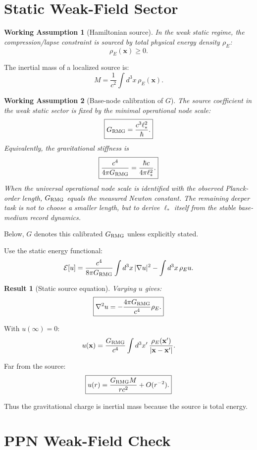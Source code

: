 \documentclass[11pt]{article}
\newtheorem{assumption}{Working Assumption}
\newtheorem{result}{Result}
\begin{document}
\section{Static Weak-Field Sector}

\begin{assumption}[Hamiltonian source]
In the weak static regime, the compression/lapse constraint is sourced by total
physical energy density $\rho_E$:
\[
\rho_E(\mathbf x)\ge0.
\]
\end{assumption}

The inertial mass of a localized source is:
\[
M
=
\frac{1}{c^2}\int d^3x\,\rho_E(\mathbf x).
\]

\begin{assumption}[Base-node calibration of \(G\)]
The source coefficient in the weak static sector is fixed by the minimal
operational node scale:
\[
\boxed{
G_{\rm RMG}
=
\frac{c^3\ell_*^2}{\hbar}.
}
\]
Equivalently, the gravitational stiffness is
\[
\boxed{
\frac{c^4}{4\pi G_{\rm RMG}}
=
\frac{\hbar c}{4\pi\ell_*^2}.
}
\]
When the universal operational node scale is identified with the observed
Planck-order length, \(G_{\rm RMG}\) equals the measured Newton constant.  The
remaining deeper task is not to choose a smaller length, but to derive
\(\ell_*\) itself from the stable base-medium record dynamics.
\end{assumption}

Below, \(G\) denotes this calibrated \(G_{\rm RMG}\) unless explicitly stated.

Use the static energy functional:
\[
\mathcal E[u]
=
\frac{c^4}{8\pi G_{\rm RMG}}\int d^3x\,|\nabla u|^2
-
\int d^3x\,\rho_Eu.
\]

\begin{result}[Static source equation]
Varying $u$ gives:
\[
\boxed{
\nabla^2u
=
-
\frac{4\pi G_{\rm RMG}}{c^4}\rho_E.
}
\]
\end{result}

With $u(\infty)=0$:
\[
u(\mathbf x)
=
\frac{G_{\rm RMG}}{c^4}
\int d^3x'\,
\frac{\rho_E(\mathbf x')}{|\mathbf x-\mathbf x'|}.
\]

Far from the source:
\[
\boxed{
u(r)=\frac{G_{\rm RMG}M}{rc^2}+O(r^{-2}).
}
\]

Thus the gravitational charge is inertial mass because the source is total
energy.

\section{PPN Weak-Field Check}
\end{document}
